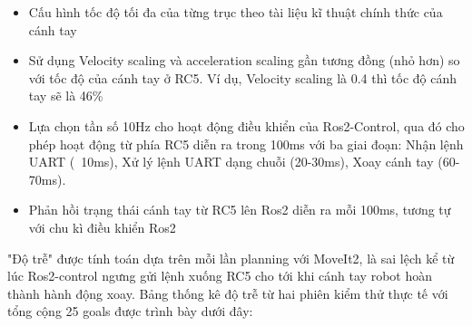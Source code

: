 \begin{itemize}
    \item Cấu hình tốc độ tối đa của từng trục theo tài liệu kĩ thuật chính thức của cánh tay
    \item Sử dụng Velocity scaling và acceleration scaling gần tương đồng (nhỏ hơn) so với tốc độ của cánh tay ở RC5. Ví dụ, Velocity scaling là 0.4 thì tốc độ cánh tay sẽ là 46\%
    \item Lựa chọn tần số 10Hz cho hoạt động điều khiển của Ros2-Control, qua đó cho phép  hoạt động từ phía RC5 diễn ra trong 100ms với ba giai đoạn: Nhận lệnh UART (~10ms), Xử lý lệnh UART dạng chuỗi (20-30ms), Xoay cánh tay (60-70ms).
    \item Phản hồi trạng thái cánh tay từ RC5 lên Ros2 diễn ra mỗi 100ms, tương tự với chu kì điều khiển Ros2
\end{itemize}

"Độ trễ" được tính toán dựa trên mỗi lần planning với MoveIt2, là sai lệch kể từ lúc Ros2-control ngưng gửi lệnh xuống RC5 cho tới khi cánh tay robot hoàn thành hành động xoay. Bảng thống kê độ trễ từ hai phiên kiểm thử thực tế với tổng cộng 25 goals được trình bày dưới đây:

